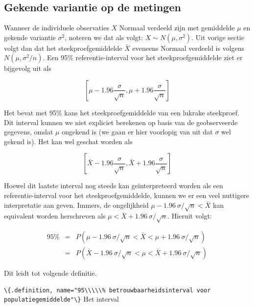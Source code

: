 \documentclass[
  12pt,dutch,coursenotes]{book}
\newcommand{\passthrough}[1]{#1}
\begin{document}
\hypertarget{subsec:bigek}{%
\subsection{Gekende variantie op de metingen}\label{subsec:bigek}}

Wanneer de individuele observaties \(X\) Normaal verdeeld zijn met gemiddelde \(\mu\) en gekende variantie \(\sigma^2\), noteren we dat als volgt: \(X\sim N(\mu,\sigma^2)\).
Uit vorige sectie volgt dan dat het steekproefgemiddelde \(\bar{X}\) eveneens Normaal verdeeld is volgens \(N(\mu,\sigma^2/n)\). Een 95\% referentie-interval voor het steekproefgemiddelde ziet er bijgevolg uit als

\begin{equation*}
\left[\mu - 1.96 \frac{\sigma}{\sqrt{n}},\mu + 1.96 \frac{\sigma}{\sqrt{n}}%
\right]
\end{equation*}

Het bevat met 95\% kans het steekproefgemiddelde van een lukrake
steekproef. Dit interval kunnen we niet expliciet berekenen op basis van de
geobserveerde gegevens, omdat \(\mu\) ongekend is (we gaan er hier voorlopig
van uit dat \(\sigma\) wel gekend is). Het kan wel geschat worden als

\begin{equation*}
\left[\bar X - 1.96 \frac{\sigma}{\sqrt{n}},\bar X + 1.96 \frac{\sigma}{\sqrt{n}}\right]
\end{equation*}

Hoewel dit laatste interval nog steeds kan geïnterpreteerd worden als
een referentie-interval voor het steekproefgemiddelde, kunnen we er een veel
nuttigere interpretatie aan geven. Immers, de ongelijkheid \(\mu - 1.96 \
\sigma/\sqrt{n} < \bar{X}\) kan equivalent worden herschreven als \(\mu < \bar{X} + 1.96 \ \sigma/\sqrt{n}\). Hieruit volgt:

\begin{eqnarray*}
95\% &=& P( \mu - 1.96 \ \sigma/\sqrt{n} < \bar{X} < \mu + 1.96 \ \sigma/\sqrt{n} ) \\
&=&P( \bar{X} - 1.96 \ \sigma/\sqrt{n} < \mu < \bar{X} + 1.96 \ \sigma/\sqrt{n} )
\end{eqnarray*}

Dit leidt tot volgende definitie.

\passthrough{\lstinline!\{.definition, name="95\\\\\% betrouwbaarheidsinterval voor populatiegemiddelde"\}!}
Het interval
\end{document}
